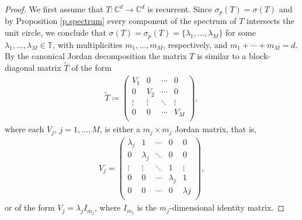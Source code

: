 \documentclass[12pt,leqno]{amsart}
\theoremstyle{plain}
\theoremstyle{definition}
\numberwithin{equation}{section}
\begin{document}
\begin{proof}
	We first assume that $T:{\mathbb C}^d\to {\mathbb C}^d$ is recurrent. Since $\sigma_p(T)=\sigma(T)$ and by Proposition \ref{p.spectrum} every component of the spectrum of $T$ intersects the unit circle, we conclude that $\sigma(T)=\sigma_p(T)=\{\lambda_1,\ldots,\lambda_M\}$ for some $\lambda_1,\ldots,\lambda_M\in\mathbb T$, with multiplicities $m_1,\ldots,m_M$, respectively, and $m_1+\cdots+m_M=d$. By the canonical Jordan decomposition the matrix $T$ is similar to a block-diagonal matrix $\tilde T$ of the form 
	\begin{align*}
		\tilde T\coloneqq 
		\begin{pmatrix}
			V_1& 0 & \cdots &0 \\
			0 & V_2 & \cdots & 0 \\
			\vdots & \vdots & \ddots & \vdots \\
			0 & 0 & \cdots & V_M\\
		\end{pmatrix}
		, 
	\end{align*}
	where each $V_j$, $j=1,\ldots,M$, is either a $m_j\times m_j$ Jordan matrix, that is, 
	\begin{align}
		\label{e.jordan} V_j= 
		\begin{pmatrix}
			\lambda_j &1 & \cdots&0 &0 \\
			0 & \lambda_j & \ddots &0 & 0 \\
			\vdots & \vdots & \ddots & 1 &\vdots \\
			0 & 0 & \cdots & \lambda_j & 1 \\
			0 & 0 & \cdots & 0 & \lambda j\\
		\end{pmatrix}
		, 
	\end{align}
	or of the form $V_j=\lambda_j I_{m_j}$, where $I_{m_j}$ is the $m_j$-dimensional identity matrix.
	

\end{proof}
\end{document}
